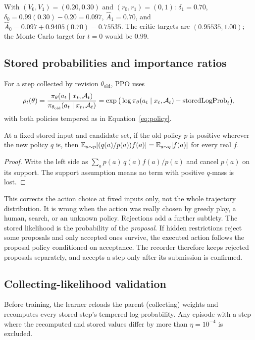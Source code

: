 \begin{example}
With $(V_0,V_1)=(0.20,0.30)$ and $(r_0,r_1)=(0,1)$: $\delta_1=0.70$,
$\delta_0=0.99(0.30)-0.20=0.097$, $\widehat A_1=0.70$, and
$\widehat A_0=0.097+0.9405(0.70)=0.75535$. The critic targets are
$(0.95535,1.00)$; the Monte Carlo target for $t=0$ would be 0.99.
\end{example}

\subsection{Stored probabilities and importance ratios}
\label{sec:ratios}
For a step collected by revision $\theta_{\mathrm{old}}$, PPO uses
\begin{equation}
  \rho_t(\theta)=\frac{\pi_\theta(a_t\mid x_t,\mathcal{A}_t)}{\pi_{\theta_{\mathrm{old}}}(a_t\mid x_t,\mathcal{A}_t)}
  =\exp\big(\log\pi_\theta(a_t\mid x_t,\mathcal{A}_t)-\mathrm{storedLogProb}_t\big),
\end{equation}
with both policies tempered as in Equation~\eqref{eq:policy}.

\begin{proposition}
\label{prop:importance}
At a fixed stored input and candidate set, if the old policy $p$ is positive
wherever the new policy $q$ is, then $\mathbb{E}_{a\sim p}[(q(a)/p(a))f(a)]=\mathbb{E}_{a\sim
q}[f(a)]$ for every real $f$.
\end{proposition}
\begin{proof}
Write the left side as $\sum_ap(a)\,q(a)f(a)/p(a)$ and cancel $p(a)$ on its
support. The support assumption means no term with positive $q$-mass is lost.
\end{proof}

This corrects the action choice at fixed inputs only, not the whole
trajectory distribution. It is wrong when the action was really chosen by
greedy play, a human, search, or an unknown policy. Rejections add a further
subtlety. The stored likelihood is the probability of the \emph{proposal}. If
hidden restrictions reject some proposals and only accepted ones survive, the
executed action follows the proposal policy conditioned on acceptance. The
recorder therefore keeps rejected proposals separately, and accepts a step
only after its submission is confirmed.

\subsection{Collecting-likelihood validation}
\label{sec:likelihood}
Before training, the learner reloads the parent (collecting) weights and
recomputes every stored step's tempered log-probability. Any episode with a
step where the recomputed and stored values differ by more than
$\eta=10^{-4}$ is excluded.

